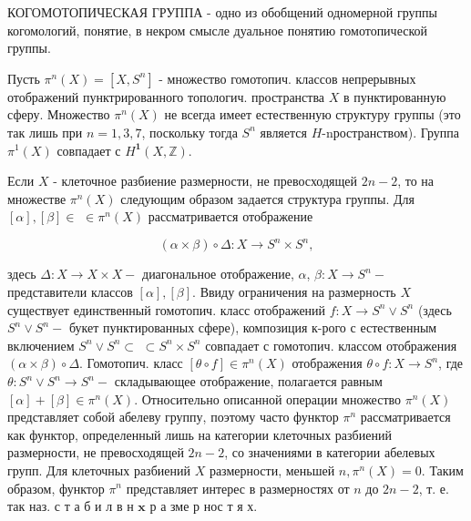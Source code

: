 \documentclass[10pt]{article}
\begin{document}
КОГОМОТОПИЧЕСКАЯ ГРУППА - одно из обобщений одномерной группы когомологий, понятие, в некром смысле дуальное понятию гомотопической группы.



Пусть $\pi^{n}(X)=\left[X, S^{n}\right]$ - множество гомотопич. классов непрерывных отображений пунктрированного топологич. пространства $X$ в пунктированную сферу. Множество $\pi^{n}(X)$ не всегда имеет естественную структуру группы (это так лишь при $n=1,3,7$, поскольку тогда $S^{n}$ является $H$-nространством). Группа $\pi^{1}(X)$ совпадает с $H^{\mathbf{1}}(X, \mathbb{Z})$.



Если $X$ - клеточное разбиение размерности, не превосходящей $2 n-2$, то на множестве $\pi^{n}(X)$ следующим образом задается структура группы. Для $[\alpha],[\beta] \in$ $\in \pi^{n}(X)$ рассматривается отображение



\[

(\alpha \times \beta) \circ \Delta: X \longrightarrow S^{n} \times S^{n},

\]



здесь $\Delta: X \rightarrow X \times X-$ диагональное отображение, $\alpha$, $\beta: X \rightarrow S^{n}-$ представители классов $[\alpha],[\beta]$. Ввиду ограничения на размерность $X$ существует единственный гомотопич. класс отображений $f: X \rightarrow S^{n} \vee S^{n}$ (здесь $S^{n} \vee S^{n}-$ букет пунктированных сфере), композиция к-рого с естественным включением $S^{n} \vee S^{n} \subset$ $\subset S^{n} \times S^{n}$ совпадает с гомотопич. классом отображения $(\alpha \times \beta) \circ \Delta$. Гомотопич. класс $[\theta \circ f] \in \pi^{n}(X)$ отображения $\theta \circ f: X \rightarrow S^{n}$, где $\theta: S^{n} \vee S^{n} \rightarrow S^{n}-$ складывающее отображение, полагается равным $[\alpha]+[\beta] \in \pi^{n}(X)$. Относительно описанной операции множество $\pi^{n}(X)$ представляет собой абелеву группу, поэтому часто функтор $\pi^{n}$ рассматривается как функтор, определенный лишь на категории клеточных разбиений размерности, не превосходящей $2 n-2$, со значениями в категории абелевых групп. Для клеточных разбиений $X$ размерности, меньшей $n, \pi^{n}(X)=0$. Таким образом, функтор $\pi^{n}$ представляет интерес в размерностях от $n$ до $2 n-2$, т. е. так наз. с т а б и л в н $\mathbf{x}$ р а зме р нос т я х.
\end{document}

